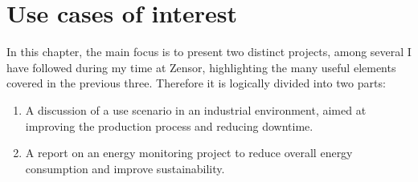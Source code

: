 \chapter{Use cases of interest}
\label{chapter:use_cases}
In this chapter, the main focus is to present two distinct projects, among several I have followed during my time at Zensor, highlighting the many useful elements covered in the previous three. %
Therefore it is logically divided into two parts:
\begin{enumerate}
    \item A discussion of a use scenario in an industrial environment, aimed at improving the production process and reducing downtime.
    \item A report on an energy monitoring project to reduce overall energy consumption and improve sustainability.
\end{enumerate}


\clearpage



